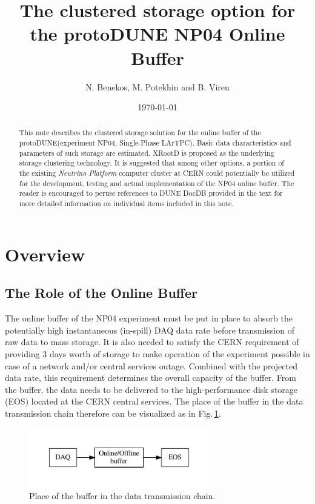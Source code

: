 \documentclass[pdftex,12pt,letter]{article}
\title{The clustered storage option for the protoDUNE NP04 Online Buffer}
\date{\today}
\author{N. Benekos, M. Potekhin and B. Viren}
\newcommand{\pd}{protoDUNE\xspace}
\newcommand{\xrd}{XRootD\xspace}
\begin{document}
\maketitle

\begin{abstract}
\noindent  This note describes the clustered storage
solution for the online buffer of the \pd (experiment NP04, Single-Phase LArTPC).
Basic data characteristics and  parameters of such storage are estimated. \xrd is proposed as the underlying
storage clustering technology. It is suggested that among other options, a portion of the existing   \textit{Neutrino Platform}
computer cluster at CERN could potentially be utilized for the development, testing and actual implementation of the NP04 online buffer. 
The reader is encouraged to peruse references to DUNE DocDB provided in the text for more detailed information on individual
items included in this note.
\end{abstract}

\section{Overview}
\subsection{The Role of the Online Buffer}
\label{sec:the_role}
The online buffer of the NP04 experiment must be put in place to absorb the potentially high instantaneous (in-spill) DAQ
data rate before transmission of raw data to mass storage. It is also needed to satisfy the CERN requirement of providing
3 days worth of storage to make operation of the experiment possible in case of a network and/or central services outage.
Combined with the projected data rate, this requirement determines the overall capacity of the buffer. From the buffer,
the data needs to be delivered to the high-performance  disk storage (EOS) located at the CERN central services.
The place of the buffer in the data transmission chain therefore can be visualized as in Fig.\,\ref{fig:big-picture}.
\begin{figure}[tbh]
  \centering
  \includegraphics[width=0.7\textwidth]{figures/big-picture.pdf}
  \caption{Place of the buffer in the data transmission chain.}
  \label{fig:big-picture}
\end{figure}
\end{document}
